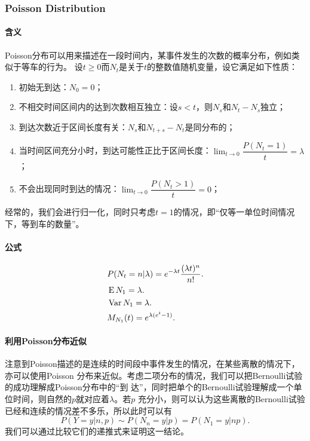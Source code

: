   \subsubsection{Poisson Distribution}
    \paragraph{含义}
    Poisson分布可以用来描述在一段时间内，某事件发生的次数的概率分布，例如类似于等车的行为。
    设$t\ge 0$而$N_t$是关于$t$的整数值随机变量，设它满足如下性质：
    \begin{enumerate}
      \item 初始无到达：$N_0=0$；
      \item 不相交时间区间内的达到次数相互独立：设$s<t$，则$N_s$和$N_t-N_s$独立；
      \item 到达次数近于区间长度有关：$N_s$和$N_{t+s}-N_t$是同分布的；
      \item 当时间区间充分小时，到达可能性正比于区间长度：$\lim_{t\to 0}
            \dfrac{P(N_t=1)}{t}=\lambda$；
      \item 不会出现同时到达的情况：$\lim_{t\to 0}\dfrac{P(N_t>1)}{t}=0$；
    \end{enumerate}
    经常的，我们会进行归一化，同时只考虑$t=1$的情况，即“仅等一单位时间情况下，等到车的数量”。
    
    \paragraph{公式}
    \begin{align*}
      & P(N_t=n|\lambda) = e^{-\lambda t}\frac{(\lambda t)^n}{n!}. \\
      & \operatorname{E} N_1 = \lambda. \\
      & \operatorname{Var} N_1 = \lambda. \\
      & M_{N_1}(t) = e^{\lambda(e^t-1)}.
    \end{align*}

    \paragraph{利用Poisson分布近似}
    注意到Poisson描述的是连续的时间段中事件发生的情况，在某些离散的情况下，亦可以使用Poisson
    分布来近似。考虑二项分布的情况，我们可以把Bernoulli试验的成功理解成Poisson分布中的“到
    达”，同时把单个的Bernoulli试验理解成一个单位时间，则自然的$p$就对应着$\lambda$。若$p$
    充分小，则可以认为这些离散的Bernoulli试验已经和连续的情况差不多乐，所以此时可以有
    \[
      P(Y=y|n,p) \sim P(N_n=y|p) = P(N_1=y|np).
    \]
    我们可以通过比较它们的递推式来证明这一结论。
